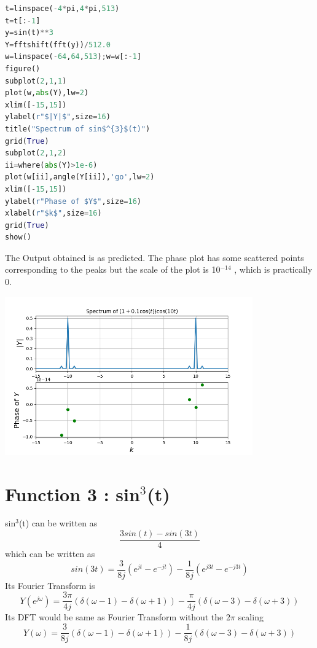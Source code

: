 \documentclass[a4paper]{article}
\begin{document}
\begin{lstlisting}[language=Python]
t=linspace(-4*pi,4*pi,513)
t=t[:-1]
y=sin(t)**3
Y=fftshift(fft(y))/512.0
w=linspace(-64,64,513);w=w[:-1]
figure()
subplot(2,1,1)
plot(w,abs(Y),lw=2)
xlim([-15,15])
ylabel(r"$|Y|$",size=16)
title("Spectrum of sin$^{3}$(t)")
grid(True)
subplot(2,1,2)
ii=where(abs(Y)>1e-6)
plot(w[ii],angle(Y[ii]),'go',lw=2)
xlim([-15,15])
ylabel(r"Phase of $Y$",size=16)
xlabel(r"$k$",size=16)
grid(True)
show()
\end{lstlisting}

The Output obtained is as predicted. The phase plot has some scattered points corresponding to the peaks but the scale of the plot is 10$^{-14}$  , which is practically 0.
\begin{center}
\includegraphics[width=0.8\textwidth]{Figure_2.png}
\end{center}


\section{Function 3 : sin$^{3}$(t)}
sin$^{3}$(t) can be written as $$ \frac{3sin(t) - sin(3t)}{4} $$
which can be written as $$sin(3t) = \frac{3}{8j}(e^{jt} - e^{-jt}) - \frac{1}{8j}(e^{j3t} - e^{-j3t})$$
Its Fourier Transform is $$Y(e^{j\omega}) = \frac{3\pi}{4j} (\delta(\omega - 1) - \delta(\omega + 1)) -  \frac{\pi}{4j} (\delta(\omega - 3) - \delta(\omega + 3))$$
Its DFT would be same as Fourier Transform without the 2$\pi$ scaling $$Y(\omega) = \frac{3}{8j} (\delta(\omega - 1) - \delta(\omega + 1)) -  \frac{1}{8j} (\delta(\omega - 3) - \delta(\omega + 3))$$
\end{document}
